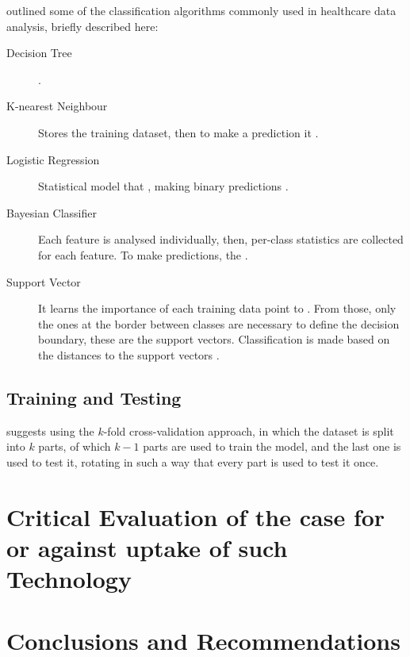 \documentclass[a4paper,12pt]{article}
\begin{document}
\textcite{Jothi2015} outlined some of the classification algorithms commonly used in healthcare data analysis, briefly described here:

\begin{description}
    \item[Decision Tree] .
    \item[K-nearest Neighbour] Stores the training dataset, then to make a prediction it .
    \item[Logistic Regression] Statistical model that , making binary predictions \parencite{Nick2007}.
    \item[Bayesian Classifier] Each feature is analysed individually, then, per-class statistics are collected for each feature. 
    To make predictions, the .
    \item[Support Vector] It learns the importance of each training data point to .
    From those, only the ones at the border between classes are necessary to define the decision boundary, these are the support vectors.
    Classification is made based on the distances to the support vectors \parencite[98]{Mueller2017}.
\end{description}

\subsection{Training and Testing}

\textcite[39]{Consoli2019} suggests using the \(k\)-fold cross-validation approach, in which the dataset is split into \(k\) parts, of which \(k-1\) parts are used to train the model, and the last one is used to test it, rotating in such a way that every part is used to test it once. 


\section{Critical Evaluation of the case for or against uptake of such Technology}



\section{Conclusions and Recommendations}
\pagebreak
\printbibliography
\end{document}
